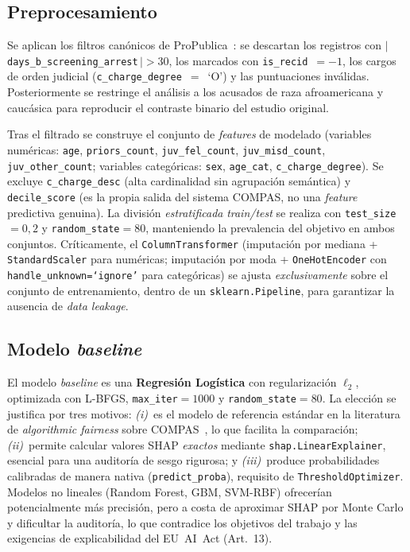 \documentclass[11pt,a4paper]{article}
\begin{document}
\subsection{Preprocesamiento}
\label{sec:preproc}

Se aplican los filtros canónicos de ProPublica~\cite{propublica_compas_2016}: se descartan los registros con $|\,$\texttt{days\_b\_screening\_arrest}$\,|>30$, los marcados con \texttt{is\_recid}~$=-1$, los cargos de orden judicial (\texttt{c\_charge\_degree}~$=$~`O') y las puntuaciones inválidas. Posteriormente se restringe el análisis a los acusados de raza afroamericana y caucásica para reproducir el contraste binario del estudio original.

Tras el filtrado se construye el conjunto de \textit{features} de modelado (variables numéricas: \texttt{age}, \texttt{priors\_count}, \texttt{juv\_fel\_count}, \texttt{juv\_misd\_count}, \texttt{juv\_other\_count}; variables categóricas: \texttt{sex}, \texttt{age\_cat}, \texttt{c\_charge\_degree}). Se excluye \texttt{c\_charge\_desc} (alta cardinalidad sin agrupación semántica) y \texttt{decile\_score} (es la propia salida del sistema COMPAS, no una \textit{feature} predictiva genuina). La división \emph{estratificada} \textit{train/test} se realiza con \texttt{test\_size}$=0{,}2$ y \texttt{random\_state}$=80$, manteniendo la prevalencia del objetivo en ambos conjuntos. Críticamente, el \texttt{ColumnTransformer} (imputación por mediana + \texttt{StandardScaler} para numéricas; imputación por moda + \texttt{OneHotEncoder} con \texttt{handle\_unknown=`ignore'} para categóricas) se ajusta \emph{exclusivamente} sobre el conjunto de entrenamiento, dentro de un \texttt{sklearn.Pipeline}, para garantizar la ausencia de \textit{data leakage}.

\subsection{Modelo \textit{baseline}}

El modelo \textit{baseline} es una \textbf{Regresión Logística} con regularización $\ell_2$, optimizada con L-BFGS, \texttt{max\_iter}$=1000$ y \texttt{random\_state}$=80$. La elección se justifica por tres motivos: \emph{(i)}~es el modelo de referencia estándar en la literatura de \textit{algorithmic fairness} sobre COMPAS~\cite{angwin2016machine, hardt2016equality, chouldechova2017fair}, lo que facilita la comparación; \emph{(ii)}~permite calcular valores SHAP \emph{exactos} mediante \texttt{shap.LinearExplainer}, esencial para una auditoría de sesgo rigurosa; y \emph{(iii)}~produce probabilidades calibradas de manera nativa (\texttt{predict\_proba}), requisito de \texttt{ThresholdOptimizer}. Modelos no lineales (Random Forest, GBM, SVM-RBF) ofrecerían potencialmente más precisión, pero a costa de aproximar SHAP por Monte Carlo y dificultar la auditoría, lo que contradice los objetivos del trabajo y las exigencias de explicabilidad del EU~AI~Act (Art.~13).
\end{document}
